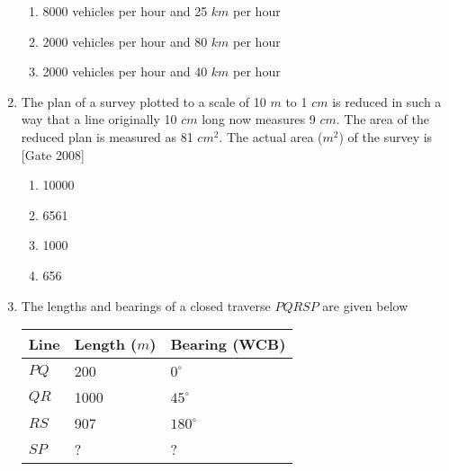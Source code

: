 \documentclass[journal]{IEEEtran}
\begin{document}
\begin{enumerate}
\begin{multicols}{2}
\begin{enumerate}
		\item 8000 vehicles per hour and 25 $km$ per hour
		\item 2000 vehicles per hour and 80 $km$ per hour
		\item 2000 vehicles per hour and 40 $km$ per hour
	\end{enumerate}
\end{multicols}	
	\item The plan of a survey plotted to a scale of 10 $m$ to 1 $cm$ is reduced in such a way that a line originally 10 $cm$ long now measures 9 $cm$. The area of the reduced plan is measured as 81 $cm^2$. The actual area ($m^2$) of the survey is \hfill [Gate 2008]
\begin{multicols}{4}
	\begin{enumerate}
		\item 10000
		\item 6561
		\item 1000
		\item 656
	\end{enumerate}
\end{multicols}	
	\item The lengths and bearings of a closed traverse $PQRSP$ are given below 
		\begin{table}[h]
	\centering
\begin{tabular}{|l|l|l|}
	\hline
	 Line & Length ($m$)   &  Bearing (WCB)  \\

	\hline
	$PQ$ & 200 & $0^{\circ}$   \\
	\hline
	$QR$ & 1000  &$45^{\circ}$  \\
	\hline
	$RS$ & 907 & $180^{\circ}$  \\
	\hline
	 $SP$  & ?  & ?  \\
	\hline
	



\end{tabular} 
\end{table}
		

\end{enumerate}
\end{document}
